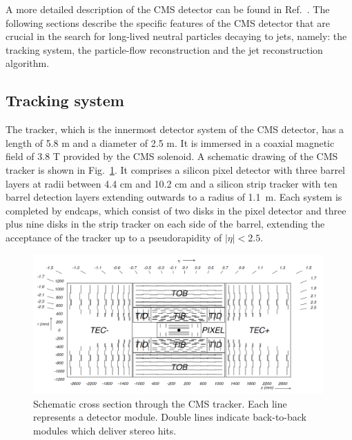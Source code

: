 A more detailed description of the CMS detector can be found in Ref.~\cite{Chatrchyan:2008zzk}.  
The following sections describe the specific features of the CMS detector
that are crucial in the search for long-lived neutral particles decaying to jets, namely: the
tracking system, the particle-flow reconstruction and the jet reconstruction algorithm.

\subsection{Tracking system}
\label{subsec:trackreco}

The tracker, which is the innermost detector system of the CMS detector, has a length
of 5.8 m and a
diameter of 2.5 m. It is immersed in a coaxial magnetic field of 3.8 T
provided by the CMS solenoid. A schematic drawing of the CMS tracker is shown in
Fig.~\ref{fig:tracker}. It comprises a silicon pixel detector with three barrel layers at radii
between 4.4 cm and 10.2 cm and a silicon strip tracker with ten barrel
detection layers extending outwards to a radius of 1.1~m. Each system is
completed by endcaps, which consist of two disks in the pixel detector and three
plus nine disks in the strip tracker on each side of the barrel, extending
the acceptance of the tracker up to a pseudorapidity of $|\eta| < 2.5$.
\begin{figure}[!h]
\centering
\includegraphics[width=0.99\textwidth]{plots/intro/tracker.png}
\caption{Schematic cross section through the CMS tracker. Each line represents a
detector module. Double lines indicate back-to-back modules which deliver stereo
hits.\label{fig:tracker}}
\end{figure}

